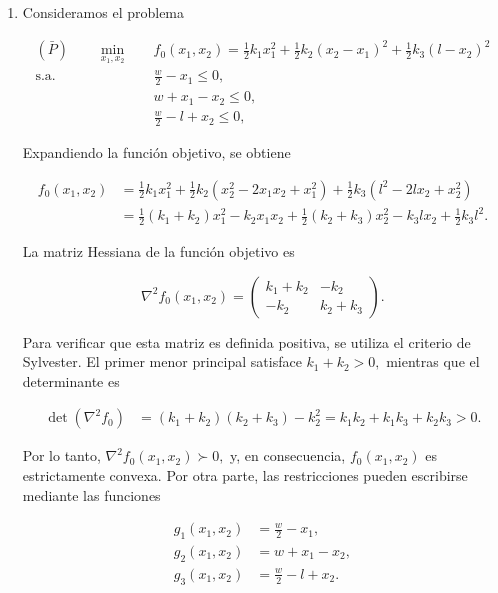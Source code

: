 \begin{enumerate}
  \item[(a)]

Consideramos el problema

\begin{align}
(\bar P)\qquad
\min_{x_1,x_2}\quad
& f_0(x_1,x_2)
=
\frac{1}{2}k_1x_1^2
+
\frac{1}{2}k_2(x_2-x_1)^2
+
\frac{1}{2}k_3(l-x_2)^2
\label{ex:6:6:eq:primal_obj}\\
\text{s.a.}\quad
& \frac{w}{2}-x_1\leq 0,
\label{ex:6:6:eq:R1}\\
& w+x_1-x_2\leq 0,
\label{ex:6:6:eq:R2}\\
& \frac{w}{2}-l+x_2\leq 0,
\label{ex:6:6:eq:R3}
\end{align}

Expandiendo la función objetivo, se obtiene

\begin{align}
f_0(x_1,x_2)
&=
\frac{1}{2}k_1x_1^2
+
\frac{1}{2}k_2\left(x_2^2-2x_1x_2+x_1^2\right)
+
\frac{1}{2}k_3\left(l^2-2lx_2+x_2^2\right)\\
&=
\frac{1}{2}(k_1+k_2)x_1^2
-k_2x_1x_2
+\frac{1}{2}(k_2+k_3)x_2^2
-k_3lx_2
+\frac{1}{2}k_3l^2.
\end{align}

La matriz Hessiana de la función objetivo es

\begin{equation}
\nabla^2 f_0(x_1,x_2)
=
\begin{pmatrix}
k_1+k_2 & -k_2\\
-k_2 & k_2+k_3
\end{pmatrix}.
\end{equation}

Para verificar que esta matriz es definida positiva, se utiliza el criterio de Sylvester. El primer menor principal satisface $k_1+k_2>0,$ mientras que el determinante es

\begin{align}
\det\left(\nabla^2 f_0\right)
&=
(k_1+k_2)(k_2+k_3)-k_2^2=
k_1k_2+k_1k_3+k_2k_3>0.
\end{align}

Por lo tanto, $\nabla^2 f_0(x_1,x_2)\succ 0,$ y, en consecuencia, $f_0(x_1,x_2)$ es estrictamente convexa. Por otra parte, las restricciones pueden escribirse mediante las funciones

\begin{align}
g_1(x_1,x_2)
&=
\frac{w}{2}-x_1,\\
g_2(x_1,x_2)
&=
w+x_1-x_2,\\
g_3(x_1,x_2)
&=
\frac{w}{2}-l+x_2.
\end{align}


\end{enumerate}
